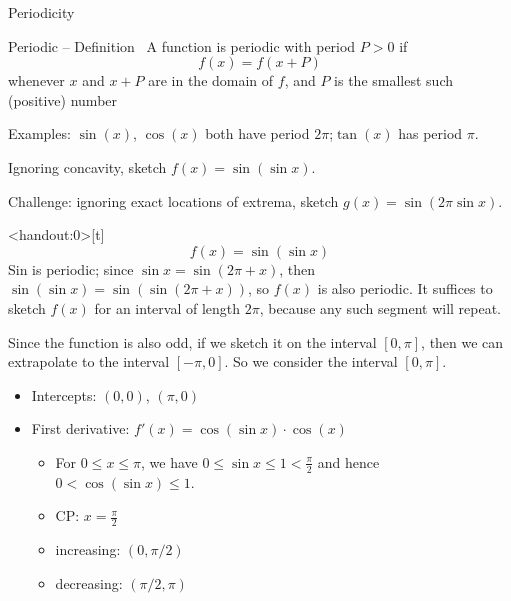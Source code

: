 \begin{frame}[t]{Periodicity}
\begin{block}{Periodic -- Definition~}
A function is \textcolor{M3}{periodic} with period $P>0$ if
\[f(x)=f(x+P)\]
whenever $x$ and $x+P$ are in the domain of $f$, and $P$ is the smallest such (positive) number
\end{block}
Examples: $\sin (x)$, $\cos (x)$ both have period $2\pi$;\quad $\tan (x)$ has period $\pi$.
\end{frame}
\begin{frame}[t]\MoreSpace\AnswerYes

Ignoring concavity, sketch $f(x)=\sin(\sin x)$.

\vfill

Challenge: ignoring exact locations of extrema, sketch $g(x)=\sin(2\pi \sin x)$.

\vfill
{}
\end{frame}
\begin{frame}<handout:0>[t]
\[f(x)=\sin(\sin x)\]\pause
{}
\color{answercolor}
Sin is periodic; since $\sin x = \sin (2\pi+x)$, then $\sin(\sin x) = \sin (\sin (2\pi+x))$, so $f(x)$ is also periodic. It suffices to sketch $f(x)$ for an interval of length $2\pi$, because any such segment will repeat.

Since the function is also odd, if we sketch it on the interval $[0,\pi]$, then we can extrapolate to the interval $[-\pi,0]$. So we consider the interval $[0,\pi]$.

\begin{itemize}
\item Intercepts: $(0,0)$, $(\pi,0)$
\item First derivative: $f'(x) = \cos(\sin x)\cdot \cos(x)$ 
	\begin{itemize}
        \item For $0\le x\le\pi$, we have $0\le\sin x\le 1<\frac{\pi}{2}$ 
            and hence $0<\cos(\sin x)\le 1$.
	\item CP: $x= \frac\pi2$
	\item increasing: $(0,\pi/2)$
	\item decreasing: $(\pi/2,\pi)$
	\end{itemize}
\end{itemize}
\end{frame}
